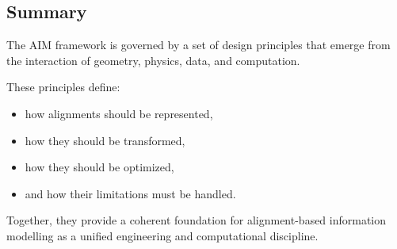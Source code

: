 \subsection{Summary}

\begin{summary}
The AIM framework is governed by a set of design principles that
emerge from the interaction of geometry, physics, data, and computation.

These principles define:
\begin{itemize}
\item how alignments should be represented,
\item how they should be transformed,
\item how they should be optimized,
\item and how their limitations must be handled.
\end{itemize}

Together, they provide a coherent foundation for alignment-based
information modelling as a unified engineering and computational
discipline.
\end{summary}

